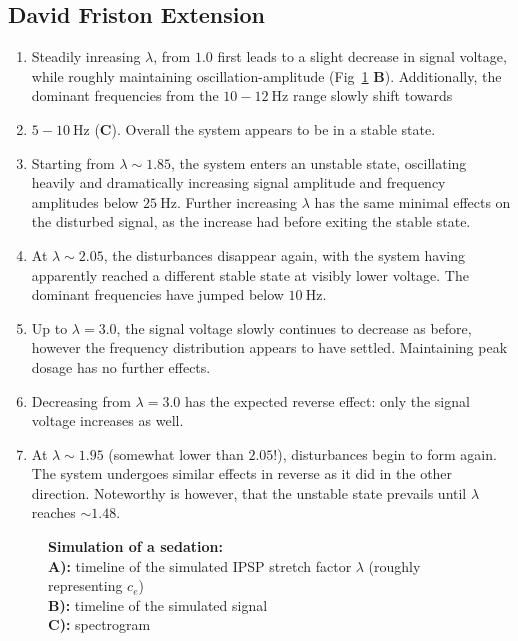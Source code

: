 \subsection{David Friston Extension}


\begin{enumerate}
    \item Steadily inreasing $ \lambda $, from $1.0$ first leads to a slight decrease in signal voltage, while roughly
    maintaining
    oscillation-amplitude (Fig~\ref{fig:sedation_sim_df} \textbf{B}).
    Additionally, the dominant frequencies from the $ 10-12 \SI{}{\hertz} $ range slowly shift towards
    \item $ 5-10 \SI{}{\hertz} $ (\textbf{C}).
    Overall the system appears to be in a stable state.

    \item Starting from $ \lambda \sim 1.85 $, the system enters an unstable state, oscillating heavily and dramatically
    increasing signal amplitude and frequency amplitudes below $ \SI{25}{\hertz} $.
    Further increasing $\lambda$ has the same minimal effects on the disturbed signal,
    as the increase had before exiting the stable state.

    \item At $\lambda \sim 2.05 $, the disturbances disappear again, with the system having apparently reached a different
    stable state at visibly lower voltage.
    The dominant frequencies have jumped below $\SI{10}{\hertz}$.

    \item Up to $\lambda = 3.0$, the signal voltage slowly continues to decrease as before,
    however the frequency distribution appears to have settled.
    Maintaining peak dosage has no further effects.

    \item Decreasing from $\lambda = 3.0$ has the expected reverse effect: only the signal voltage increases as well.

    \item At $\lambda \sim 1.95$ (somewhat lower than $2.05$!), disturbances begin to form again.
    The system undergoes similar effects in reverse as it did in the other direction.
    Noteworthy is however, that the unstable state prevails until $\lambda$ reaches $\sim 1.48$.
\end{enumerate}

\begin{figure}[H]
\toggletrue{drawLocRoc}
\def\simRunName{linear}

\caption{\textbf{Simulation of a sedation:} \\
        \textbf{A):} timeline of the simulated IPSP stretch factor $\lambda$ (roughly representing $c_e$) \\
        \textbf{B):} timeline of the simulated signal \\
        \textbf{C):} spectrogram
}\label{fig:sedation_sim_df}
\end{figure}

